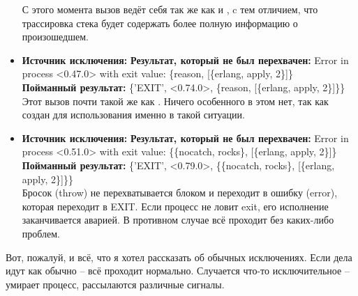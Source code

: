 \begin{itemize}
    С этого момента вызов ведёт себя так же как и , c тем отличием, что трассировка стека будет содержать более полную информацию о произошедшем.\\
    \item \textbf{Источник исключения:} 
    \textbf{Результат, который не был перехвачен:} Error in process <0.47.0> with exit value: \{reason, [\{erlang, apply, 2\}]\}\\
    \textbf{Пойманный результат:} \{'EXIT', <0.74.0>, \{reason, [\{erlang, apply, 2\}]\}\}\\
    Этот вызов почти такой же как .
    Ничего особенного в этом нет, так как  создан для использования именно в такой ситуации.\\
    \item \textbf{Источник исключения:} 
    \textbf{Результат, который не был перехвачен:} Error in process <0.51.0> with exit value: \{\{nocatch, rocks\}, [\{erlang, apply, 2\}]\}\\
    \textbf{Пойманный результат:} \{'EXIT', <0.79.0>, \{\{nocatch, rocks\}, [\{erlang, apply, 2\}]\}\}\\
    Бросок (throw) не перехватывается блоком   и переходит в ошибку (error), которая переходит в EXIT.
    Если процесс не ловит exit, его исполнение заканчивается аварией.
    В противном случае всё проходит без каких\--либо проблем.
\end{itemize}

Вот, пожалуй, и всё, что я хотел рассказать об обычных исключениях.
Если дела идут как обычно \--- всё проходит нормально.
Случается что\--то исключительное \--- умирает процесс, рассылаются различные сигналы.

